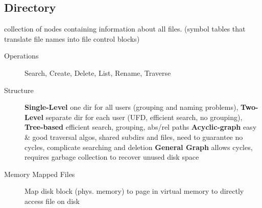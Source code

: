 \subsection*{Directory}
collection of nodes containing information about all files. (symbol tables that translate file names into file control blocks)
\begin{description}
    \item[Operations]Search, Create, Delete, List, Rename, Traverse
    \item[Structure] \textbf{Single-Level} one dir for all users (grouping and naming problems), \textbf{Two-Level} separate dir for each user (UFD, efficient search, no grouping), \textbf{Tree-based} efficient search, grouping, abs/rel paths \textbf{Acyclic-graph} easy \& good traversal algos, shared subdirs and files, need to guarantee no cycles, complicate searching and deletion \textbf{General Graph} allows cycles, requires garbage collection to recover unused disk space %
    \item[Memory Mapped Files] Map disk block (phys. memory) to page in virtual memory to directly access file on disk
\end{description}
